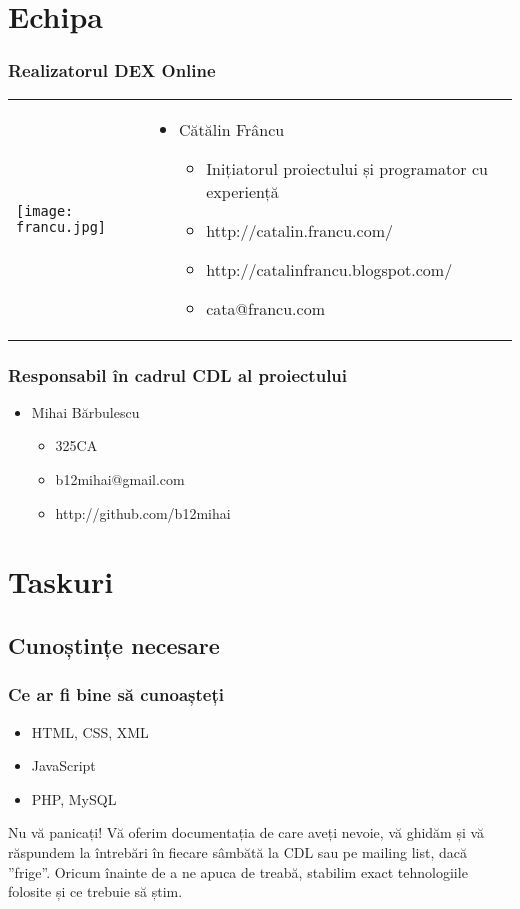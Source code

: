 \documentclass[red]{beamer}
\begin{document}
\section{Echipa}

\begin{frame}
\frametitle{Realizatorul DEX Online}

\begin{tabular}{l | p{10cm}}
\texttt{[image: francu.jpg]} & 
\begin{itemize}
   \item Cătălin Frâncu  
    \begin{itemize}
      \item Inițiatorul proiectului și programator cu experiență
     \item http://catalin.francu.com/
      \item http://catalinfrancu.blogspot.com/
     \item cata@francu.com
    \end{itemize}
   \end{itemize}
\end{tabular}
\end{frame}

\begin{frame}
\frametitle{Responsabil în cadrul CDL al proiectului}
\begin{itemize}
 \item Mihai Bărbulescu  
    \begin{itemize}
     \item 325CA
     \item b12mihai@gmail.com
      \item http://github.com/b12mihai
    \end{itemize}
\end{itemize}
\end{frame}


\section{Taskuri}
\subsection{Cunoștințe necesare}

\begin{frame}
\frametitle{Ce ar fi bine să cunoașteți}
  \begin{itemize}
   \item HTML, CSS, XML
    \item JavaScript
     \item PHP, MySQL \pause
   
  \end{itemize}

 \begin{alertblock}{Nu vă panicați!}
    Vă oferim documentația de care aveți nevoie, vă ghidăm și vă răspundem la întrebări în fiecare sâmbătă la CDL sau pe mailing list, dacă ”frige”. Oricum
înainte de a ne apuca de treabă, stabilim exact tehnologiile folosite și ce trebuie să știm.
    \end{alertblock}


\end{frame}
\end{document}
